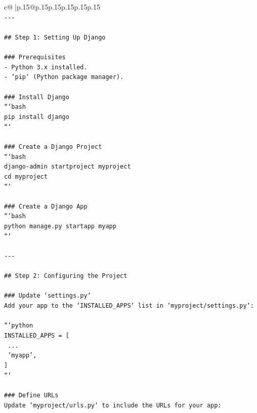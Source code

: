 \documentclass{article}
\begin{document}
{\begin{supertabular}{c@{$\;$}|p{.15\linewidth}@{}p{.15\linewidth}p{.15\linewidth}p{.15\linewidth}p{.15\linewidth}p{.15\linewidth}}
{{{\\ 
\texttt{{-}{-}{-}} \\
\\ 
\texttt{\#\# Step 1: Setting Up Django} \\
\\ 
\texttt{\#\#\# Prerequisites} \\
\texttt{{-} Python 3.x installed.} \\
\texttt{{-} `pip` (Python package manager).} \\
\\ 
\texttt{\#\#\# Install Django} \\
\texttt{```bash} \\
\texttt{pip install django} \\
\texttt{```} \\
\\ 
\texttt{\#\#\# Create a Django Project} \\
\texttt{```bash} \\
\texttt{django{-}admin startproject myproject} \\
\texttt{cd myproject} \\
\texttt{```} \\
\\ 
\texttt{\#\#\# Create a Django App} \\
\texttt{```bash} \\
\texttt{python manage.py startapp myapp} \\
\texttt{```} \\
\\ 
\texttt{{-}{-}{-}} \\
\\ 
\texttt{\#\# Step 2: Configuring the Project} \\
\\ 
\texttt{\#\#\# Update `settings.py`} \\
\texttt{Add your app to the `INSTALLED\_APPS` list in `myproject/settings.py`:} \\
\\ 
\texttt{```python} \\
\texttt{INSTALLED\_APPS = {[}} \\
\texttt{    ...} \\
\texttt{    'myapp',} \\
\texttt{{]}} \\
\texttt{```} \\
\\ 
\texttt{\#\#\# Define URLs} \\
\texttt{Update `myproject/urls.py` to include the URLs for your app:} \\
}}}
\end{supertabular}}
\end{document}
